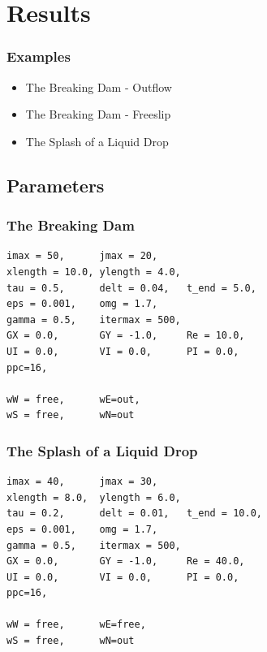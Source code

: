 \documentclass{beamer}
\begin{document}
\section{Results}
\begin{frame}
\frametitle{Examples}
\begin{itemize}
\item The Breaking Dam - Outflow
\item The Breaking Dam - Freeslip
\item The Splash of a Liquid Drop
\end{itemize}
\end{frame}

\subsection{Parameters}
\begin{frame}[fragile]
\frametitle{The Breaking Dam}
\begin{lstlisting}
imax = 50,      jmax = 20,   
xlength = 10.0, ylength = 4.0,  
tau = 0.5,      delt = 0.04,   t_end = 5.0,
eps = 0.001,    omg = 1.7,   
gamma = 0.5,    itermax = 500,
GX = 0.0,       GY = -1.0,     Re = 10.0,
UI = 0.0,       VI = 0.0,      PI = 0.0,         
ppc=16,

wW = free,      wE=out,      
wS = free,      wN=out
\end{lstlisting}
\end{frame}

\begin{frame}[fragile]
\frametitle{The Splash of a Liquid Drop}
\begin{lstlisting}
imax = 40,      jmax = 30,   
xlength = 8.0,  ylength = 6.0,  
tau = 0.2,      delt = 0.01,   t_end = 10.0,
eps = 0.001,    omg = 1.7,   
gamma = 0.5,    itermax = 500,
GX = 0.0,       GY = -1.0,     Re = 40.0,
UI = 0.0,       VI = 0.0,      PI = 0.0,         
ppc=16,

wW = free,      wE=free,      
wS = free,      wN=out
\end{lstlisting}
\end{frame}
\end{document}
